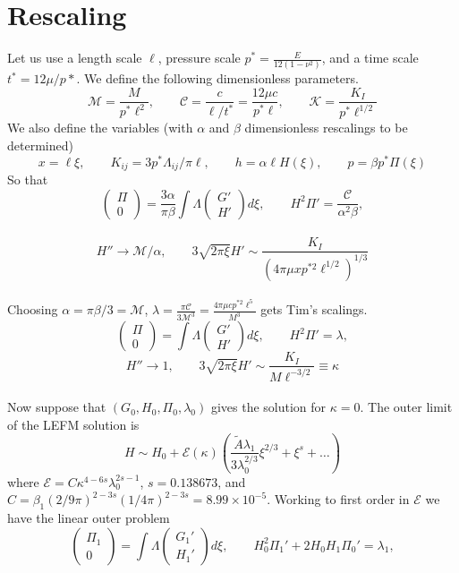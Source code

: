 \documentclass{article}
\newcommand{\cE}{\mathcal{E}}                               %
\newcommand{\cM}{\mathcal{M}}                               %
\newcommand{\cC}{\mathcal{C}}                               %
\newcommand{\cK}{\mathcal{K}}                               %
\begin{document}
\section{Rescaling}
Let us use a length scale $\ell$, pressure scale $p^* = \frac{E}{12(1-\nu^2)}$,
and a time scale $t^* = 12\mu/p*$. We define the following dimensionless
parameters.
\[\cM = \frac{M}{p^* \ell^2}, \qquad \cC = \frac{c}{\ell/t^*} = \frac{12\mu c}
{p^* \ell}, \qquad \cK = \frac{K_I}{p^* \ell ^{1/2}} \]
We also define the variables (with $\alpha$ and $\beta$ dimensionless 
rescalings to be determined)
\[ x = \ell \xi, \qquad K_{ij} = 3p^* \Lambda_{ij}/\pi \ell, \qquad
h = \alpha \ell H(\xi), \qquad p = \beta p^* \Pi ( \xi) \] 
So that
\[ \left( \begin{array}{c} \Pi \\ 0 \end{array} \right)
= \frac{3\alpha}{\pi\beta} \int \Lambda 
 \left( \begin{array}{c} G' \\ H' \end{array} \right) d\xi, \qquad
H^2 \Pi' = \frac{\cC}{\alpha^2 \beta}, \] \\
\[ H'' \to \cM/\alpha, \qquad
3\sqrt{2\pi\xi}H' \sim \frac{K_I}{(4\pi \mu x p^{*2} \ell^{1/2})^{1/3}} \]
\\
Choosing $\alpha = \pi \beta/3 = \cM$, $\displaystyle \lambda = 
\frac{\pi \cC}{3 \cM^3} = \frac{4\pi \mu c p^{*2} \ell^5}{M^3}$ gets 
Tim's scalings. 
\[ \left( \begin{array}{c} \Pi \\ 0 \end{array} \right)
= \int \Lambda 
 \left( \begin{array}{c} G' \\ H' \end{array} \right) d\xi, \qquad
H^2 \Pi' = \lambda, \] 
\[ H'' \to 1, \qquad
3\sqrt{2\pi\xi}H' \sim \frac{K_I}{M \ell^{-3/2}} \equiv \kappa \]
\\
Now suppose that $(G_0, H_0, \Pi_0, \lambda_0)$ gives the solution for 
$\kappa=0$. The outer limit of the LEFM solution is
\[ H \sim H_0 + \cE(\kappa) \left( \frac{\tilde{A} \lambda_1}{3\lambda_0^{2/3}}
\xi^{2/3} + \xi^s + \dots \right) \]
where $\cE = C \kappa^{4-6s} \lambda_0^{2s-1}$, $s = 0.138673$, and 
$C = \beta_1 (2/9\pi)^{2-3s}(1/4\pi)^{2-3s} = 8.99 \times 10^{-5}$.
Working to first order in $\cE$ we have the linear outer problem
\[ \left( \begin{array}{c} \Pi_1 \\ 0 \end{array} \right)
= \int \Lambda 
 \left( \begin{array}{c} G_1' \\ H_1' \end{array} \right) d\xi, \qquad
H_0^2 \Pi_1' + 2 H_0H_1 \Pi_0'= \lambda_1, \] 
\end{document}
